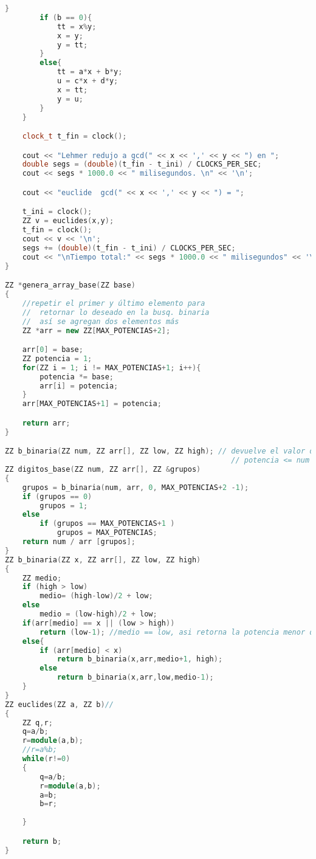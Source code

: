 \begin{lstlisting}[language=C++]
        }
        if (b == 0){
            tt = x%y;
            x = y;
            y = tt;
        }
        else{
            tt = a*x + b*y;
            u = c*x + d*y;
            x = tt;
            y = u;
        }
    }

    clock_t t_fin = clock();

    cout << "Lehmer redujo a gcd(" << x << ',' << y << ") en ";
    double segs = (double)(t_fin - t_ini) / CLOCKS_PER_SEC;
    cout << segs * 1000.0 << " milisegundos. \n" << '\n';

    cout << "euclide  gcd(" << x << ',' << y << ") = ";

    t_ini = clock();
    ZZ v = euclides(x,y);
    t_fin = clock();
    cout << v << '\n';
    segs += (double)(t_fin - t_ini) / CLOCKS_PER_SEC;
    cout << "\nTiempo total:" << segs * 1000.0 << " milisegundos" << '\n';
}

ZZ *genera_array_base(ZZ base)
{
    //repetir el primer y último elemento para
    //  retornar lo deseado en la busq. binaria
    //  así se agregan dos elementos más
    ZZ *arr = new ZZ[MAX_POTENCIAS+2];

    arr[0] = base;
    ZZ potencia = 1;
    for(ZZ i = 1; i != MAX_POTENCIAS+1; i++){
        potencia *= base;
        arr[i] = potencia;
    }
    arr[MAX_POTENCIAS+1] = potencia;

    return arr;
}

ZZ b_binaria(ZZ num, ZZ arr[], ZZ low, ZZ high); // devuelve el valor de la
                                                    // potencia <= num dentro de arr
ZZ digitos_base(ZZ num, ZZ arr[], ZZ &grupos)
{
    grupos = b_binaria(num, arr, 0, MAX_POTENCIAS+2 -1);
    if (grupos == 0)
        grupos = 1;
    else
        if (grupos == MAX_POTENCIAS+1 )
            grupos = MAX_POTENCIAS;
    return num / arr [grupos];
}
ZZ b_binaria(ZZ x, ZZ arr[], ZZ low, ZZ high)
{
    ZZ medio;
    if (high > low)
        medio= (high-low)/2 + low;
    else
        medio = (low-high)/2 + low;
    if(arr[medio] == x || (low > high))
        return (low-1); //medio == low, asi retorna la potencia menor de la base
    else{
        if (arr[medio] < x)
            return b_binaria(x,arr,medio+1, high);
        else
            return b_binaria(x,arr,low,medio-1);
    }
}
ZZ euclides(ZZ a, ZZ b)//
{
    ZZ q,r;
    q=a/b;
    r=module(a,b);
    //r=a%b;
    while(r!=0)
    {
        q=a/b;
        r=module(a,b);
        a=b;
        b=r;
               
    }

    return b;
}
\end{lstlisting}
